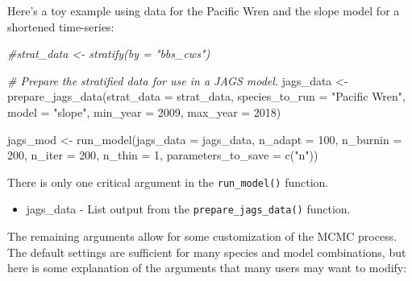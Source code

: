 \documentclass[
]{book}
\newenvironment{Shaded}{\begin{snugshade}}{\end{snugshade}}
\newcommand{\AttributeTok}[1]{\textcolor[rgb]{0.77,0.63,0.00}{#1}}
\newcommand{\CommentTok}[1]{\textcolor[rgb]{0.56,0.35,0.01}{\textit{#1}}}
\newcommand{\DecValTok}[1]{\textcolor[rgb]{0.00,0.00,0.81}{#1}}
\newcommand{\FunctionTok}[1]{\textcolor[rgb]{0.00,0.00,0.00}{#1}}
\newcommand{\NormalTok}[1]{#1}
\newcommand{\OtherTok}[1]{\textcolor[rgb]{0.56,0.35,0.01}{#1}}
\newcommand{\StringTok}[1]{\textcolor[rgb]{0.31,0.60,0.02}{#1}}
\providecommand{\tightlist}{%
  \setlength{\itemsep}{0pt}\setlength{\parskip}{0pt}}
\begin{document}
Here's a toy example using data for the Pacific Wren and the slope model for a shortened time-series:

\begin{Shaded}
\begin{Highlighting}[]
\CommentTok{\#strat\_data \textless{}{-} stratify(by = "bbs\_cws")}

\CommentTok{\# Prepare the stratified data for use in a JAGS model.}
\NormalTok{jags\_data }\OtherTok{\textless{}{-}} \FunctionTok{prepare\_jags\_data}\NormalTok{(}\AttributeTok{strat\_data =}\NormalTok{ strat\_data,}
                               \AttributeTok{species\_to\_run =} \StringTok{"Pacific Wren"}\NormalTok{,}
                               \AttributeTok{model =} \StringTok{"slope"}\NormalTok{,}
                               \AttributeTok{min\_year =} \DecValTok{2009}\NormalTok{,}
                               \AttributeTok{max\_year =} \DecValTok{2018}\NormalTok{)}


\NormalTok{jags\_mod }\OtherTok{\textless{}{-}} \FunctionTok{run\_model}\NormalTok{(}\AttributeTok{jags\_data =}\NormalTok{ jags\_data,}
                      \AttributeTok{n\_adapt =} \DecValTok{100}\NormalTok{,}
                      \AttributeTok{n\_burnin =} \DecValTok{200}\NormalTok{,}
                      \AttributeTok{n\_iter =} \DecValTok{200}\NormalTok{,}
                      \AttributeTok{n\_thin =} \DecValTok{1}\NormalTok{,}
                      \AttributeTok{parameters\_to\_save =} \FunctionTok{c}\NormalTok{(}\StringTok{"n"}\NormalTok{))}
\end{Highlighting}
\end{Shaded}

There is only one critical argument in the \texttt{run\_model()} function.

\begin{itemize}
\tightlist
\item
  jags\_data - List output from the \texttt{prepare\_jags\_data()} function.
\end{itemize}

The remaining arguments allow for some customization of the MCMC process. The default settings are sufficient for many species and model combinations, but here is some explanation of the arguments that many users may want to modify:
\end{document}
